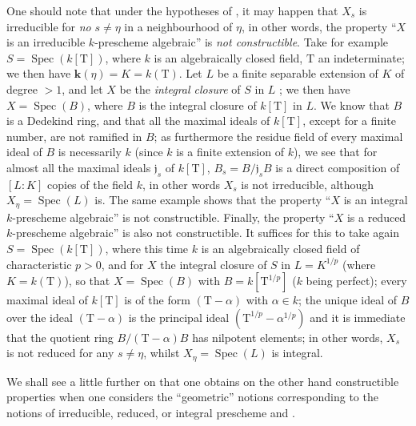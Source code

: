 \begin{remark}[9.5.7]
\label{IV.9.5.7}
One should note that under the hypotheses of , it may happen that $X_s$ is irreducible for \emph{no} $s\neq\eta$ in a neighbourhood of $\eta$, in other words, the property ``$X$ is an irreducible $k$-prescheme algebraic'' is \emph{not constructible}.
Take for example $S=\operatorname{Spec}(k[\mathrm{T}])$, where $k$ is an algebraically closed field, $\mathrm{T}$ an indeterminate; we then have $\boldsymbol{k}(\eta)=K=k(\mathrm{T})$.
Let $L$ be a finite separable extension of $K$ of degree $>1$, and let $X$ be the \emph{integral closure} of $S$ in $L$ ; we then have $X=\operatorname{Spec}(B)$, where $B$ is the integral closure of $k[\mathrm{T}]$ in $L$.
We know that $B$ is a Dedekind ring, and that all the maximal ideals of $k[\mathrm{T}]$, except for a finite number, are not ramified in $B$; as furthermore the residue field of every maximal ideal of $B$ is necessarily $k$ (since $k$ is a finite extension of $k$), we see that for almost all the maximal ideals $\mathfrak{j}_s$ of $k[\mathrm{T}]$, $B_s=B/\mathfrak{j}_s B$ is a direct composition of $[L:K]$ copies of the field $k$, in other words $X_s$ is not irreducible, although $X_\eta=\operatorname{Spec}(L)$ is.
The same example shows that the property ``$X$ is an integral $k$-prescheme algebraic'' is not constructible.
Finally, the property ``$X$ is a reduced $k$-prescheme algebraic'' is also not constructible.
It suffices for this to take again $S=\operatorname{Spec}(k[\mathrm{T}])$, where this time $k$ is an algebraically closed field of characteristic $p>0$, and for $X$ the integral closure of $S$ in $L=K^{1/p}$ (where $K=k(\mathrm{T})$), so that $X=\operatorname{Spec}(B)$ with $B=k[\mathrm{T}^{1/p}]$ ($k$ being perfect); every maximal ideal of $k[\mathrm{T}]$ is of the form $(\mathrm{T}-\alpha)$ with $\alpha\in k$; the unique ideal of $B$ over the ideal $(\mathrm{T}-\alpha)$ is the principal ideal $(\mathrm{T}^{1/p}-\alpha^{1/p})$ and it is immediate
that the quotient ring $B/(\mathrm{T}-\alpha)B$ has nilpotent elements; in other words, $X_s$ is not reduced for any $s\neq\eta$, whilst $X_\eta=\operatorname{Spec}(L)$ is integral.

We shall see a little further on  that one obtains on the other hand constructible properties when one considers the ``geometric'' notions corresponding to the notions of irreducible, reduced, or integral prescheme  and .
\end{remark}

